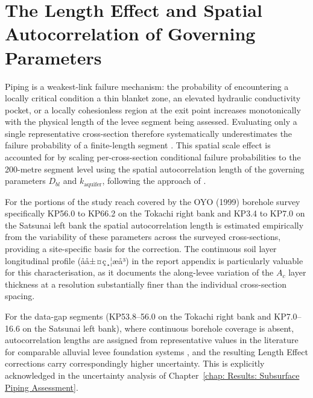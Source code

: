 \section{The Length Effect and Spatial Autocorrelation of Governing Parameters} \label{sec: The Length Effect and Spatial Autocorrelation of Governing Parameters}

Piping is a weakest-link failure mechanism: the probability of encountering a locally critical condition a thin blanket zone, an elevated hydraulic conductivity pocket, or a locally cohesionless region at the exit point increases monotonically with the physical length of the levee segment being assessed. Evaluating only a single representative cross-section therefore systematically underestimates the failure probability of a finite-length segment \parencite{kanning_2012}. This spatial scale effect is accounted for by scaling per-cross-section conditional failure probabilities to the 200-metre segment level using the spatial autocorrelation length of the governing parameters $D_{bl}$ and $k_\mathrm{aquifer}$, following the approach of \textcite{hoffmans_2014}.

For the portions of the study reach covered by the OYO (1999) borehole survey specifically KP56.0 to KP66.2 on the Tokachi right bank and KP3.4 to KP7.0 on the Satsunai left bank the spatial autocorrelation length is estimated empirically from the variability of these parameters across the surveyed cross-sections, providing a site-specific basis for the correction. The continuous soil layer longitudinal profile (åå±¤ç¸¦æ­å³) in the report appendix \parencite{oyo_1999} is particularly valuable for this characterisation, as it documents the along-levee variation of the $A_c$ layer thickness at a resolution substantially finer than the individual cross-section spacing.

For the data-gap segments (KP53.8--56.0 on the Tokachi right bank and KP7.0--16.6 on the Satsunai left bank), where continuous borehole coverage is absent, autocorrelation lengths are assigned from representative values in the literature for comparable alluvial levee foundation systems \parencite{kanning_2012, hoffmans_2014}, and the resulting Length Effect corrections carry correspondingly higher uncertainty. This is explicitly acknowledged in the uncertainty analysis of Chapter~\ref{chap: Results: Subsurface Piping Assessment}.
